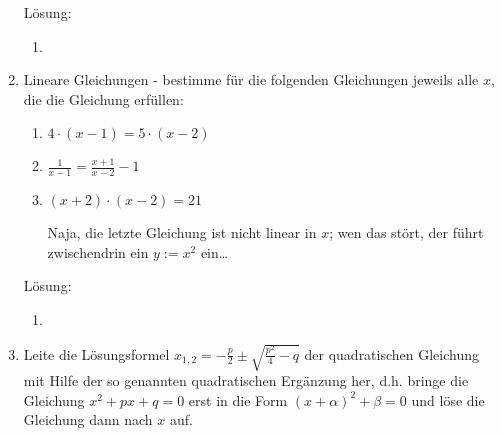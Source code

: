 \documentclass[../main.tex]{subfiles}
\begin{document}
\begin{enumerate}
	      Lösung:
	      \begin{enumerate}
		      \item
	      \end{enumerate}
	\item Lineare Gleichungen - bestimme für die folgenden Gleichungen jeweils alle
	      \begin{math}
		      x
	      \end{math}, die die Gleichung erfüllen:
	      \begin{enumerate}
		      \item \begin{math}
			            4 \cdot ( x - 1)
			            = 5 \cdot (x - 2)
		            \end{math}
		      \item \begin{math}
			            \frac{1}{x-1}
			            = \frac{x+1}{x-2} -1
		            \end{math}
		      \item \begin{math}
			            (x + 2) \cdot (x- 2) = 21
		            \end{math}

		            Naja, die letzte Gleichung ist nicht linear in \begin{math}
			            x
		            \end{math}; wen das stört, der führt
		            zwischendrin ein \begin{math}
			            y := x^2
		            \end{math} ein\ldots
	      \end{enumerate}

	      Lösung:
	      \begin{enumerate}
		      \item
	      \end{enumerate}
	\item Leite die Lösungsformel \begin{math}
		      x_{1,2} = - \frac{p}{2} \pm \sqrt{ \frac{p^2}{4} - q }
	      \end{math} der quadratischen Gleichung mit Hilfe der so genannten quadratischen Ergänzung her,
	      d.h. bringe die Gleichung \begin{math}
		      x^2 + px + q = 0
	      \end{math} erst in die Form \begin{math}
		      (x + \alpha)^2 + \beta = 0
	      \end{math} und löse die Gleichung dann nach \begin{math}
		      x
	      \end{math} auf.


\end{enumerate}
\end{document}
